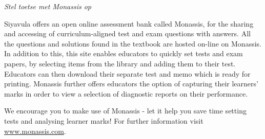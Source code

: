 
{\normalfont\sffamily\fontsize{22}\normalfont\itshape Stel toetse met Monassis op} \par

{\Large
Siyavula offers an open online assessment bank called Monassis, for the sharing and accessing of
curriculum-aligned test and exam questions with answers. All the questions and solutions found in the
textbook are hosted on-line on Monassis. In addition to this, this site enables educators to quickly set tests
and exam papers, by selecting items from the library and adding them to their test. Educators can then
download their separate test and memo which is ready for printing. Monassis further offers educators the
option of capturing their learners' marks in order to view a selection of diagnostic reports on their
performance.\par


\begin{figure}[h]
\begin{center}
\end{center}
\end{figure}


We encourage you to make use of Monassis - let it help you save time setting tests and analysing learner marks! For further information visit \underline{www.monassis.com}.






}
